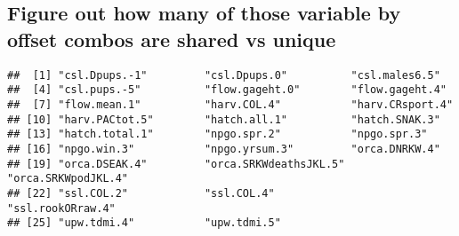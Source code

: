 \documentclass[]{article}
\newenvironment{Shaded}{\begin{snugshade}}{\end{snugshade}}
\newcommand{\KeywordTok}[1]{\textcolor[rgb]{0.13,0.29,0.53}{\textbf{{#1}}}}
\newcommand{\DataTypeTok}[1]{\textcolor[rgb]{0.13,0.29,0.53}{{#1}}}
\newcommand{\DecValTok}[1]{\textcolor[rgb]{0.00,0.00,0.81}{{#1}}}
\newcommand{\StringTok}[1]{\textcolor[rgb]{0.31,0.60,0.02}{{#1}}}
\newcommand{\CommentTok}[1]{\textcolor[rgb]{0.56,0.35,0.01}{\textit{{#1}}}}
\newcommand{\NormalTok}[1]{{#1}}
\begin{document}
\begin{Shaded}
\end{Shaded}

\subsection{Figure out how many of those variable by offset combos are
shared vs
unique}\label{figure-out-how-many-of-those-variable-by-offset-combos-are-shared-vs-unique-1}

\begin{Shaded}
\end{Shaded}

\begin{verbatim}
##  [1] "csl.Dpups.-1"         "csl.Dpups.0"          "csl.males6.5"        
##  [4] "csl.pups.-5"          "flow.gageht.0"        "flow.gageht.4"       
##  [7] "flow.mean.1"          "harv.COL.4"           "harv.CRsport.4"      
## [10] "harv.PACtot.5"        "hatch.all.1"          "hatch.SNAK.3"        
## [13] "hatch.total.1"        "npgo.spr.2"           "npgo.spr.3"          
## [16] "npgo.win.3"           "npgo.yrsum.3"         "orca.DNRKW.4"        
## [19] "orca.DSEAK.4"         "orca.SRKWdeathsJKL.5" "orca.SRKWpodJKL.4"   
## [22] "ssl.COL.2"            "ssl.COL.4"            "ssl.rookORraw.4"     
## [25] "upw.tdmi.4"           "upw.tdmi.5"
\end{verbatim}
\end{document}
